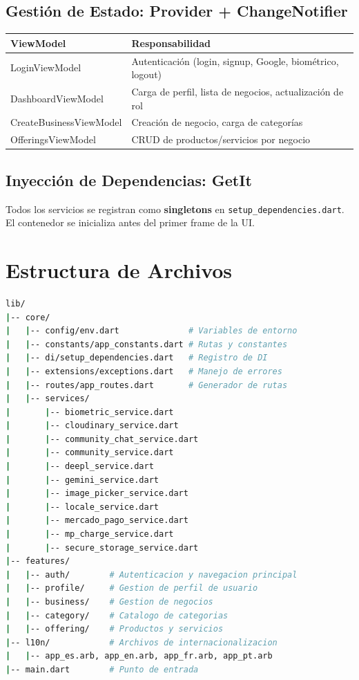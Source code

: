 \documentclass[12pt,a4paper]{article}
\begin{document}
\subsection{Gesti\'on de Estado: Provider + ChangeNotifier}

\begin{tabularx}{\textwidth}{lX}
\toprule
\textbf{ViewModel} & \textbf{Responsabilidad} \\
\midrule
LoginViewModel & Autenticaci\'on (login, signup, Google, biom\'etrico, logout) \\
DashboardViewModel & Carga de perfil, lista de negocios, actualizaci\'on de rol \\
CreateBusinessViewModel & Creaci\'on de negocio, carga de categor\'ias \\
OfferingsViewModel & CRUD de productos/servicios por negocio \\
\bottomrule
\end{tabularx}

\subsection{Inyecci\'on de Dependencias: GetIt}

Todos los servicios se registran como \textbf{singletons} en \texttt{setup\_dependencies.dart}. El contenedor se inicializa antes del primer frame de la UI.

\section{Estructura de Archivos}

\begin{lstlisting}[language=bash, title=Estructura del proyecto]
lib/
|-- core/
|   |-- config/env.dart              # Variables de entorno
|   |-- constants/app_constants.dart # Rutas y constantes
|   |-- di/setup_dependencies.dart   # Registro de DI
|   |-- extensions/exceptions.dart   # Manejo de errores
|   |-- routes/app_routes.dart       # Generador de rutas
|   |-- services/
|       |-- biometric_service.dart
|       |-- cloudinary_service.dart
|       |-- community_chat_service.dart
|       |-- community_service.dart
|       |-- deepl_service.dart
|       |-- gemini_service.dart
|       |-- image_picker_service.dart
|       |-- locale_service.dart
|       |-- mercado_pago_service.dart
|       |-- mp_charge_service.dart
|       |-- secure_storage_service.dart
|-- features/
|   |-- auth/        # Autenticacion y navegacion principal
|   |-- profile/     # Gestion de perfil de usuario
|   |-- business/    # Gestion de negocios
|   |-- category/    # Catalogo de categorias
|   |-- offering/    # Productos y servicios
|-- l10n/            # Archivos de internacionalizacion
|   |-- app_es.arb, app_en.arb, app_fr.arb, app_pt.arb
|-- main.dart        # Punto de entrada
\end{lstlisting}
\end{document}
